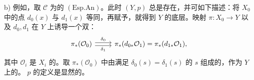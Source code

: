 b) 例如，取 $\mathcal C$ 为的 $(\mathrm{Esp.An})$。此时 $(Y,p)$ 总是存在，并可如下描述：将 $X_0$ 中的点 $d_0(x)$ 与 $d_1(x)$ 等同，再赋予，就得到 $Y$ 的底层。映射 $\pi:X_0\to Y$ 以及 $d_0,d_1$ 在 $Y$ 上诱导一个双：
\[
\begin{tikzcd}
\pi_*(\mathcal O_0)\arrow[r,shift left=.5ex,"\delta_0"]\arrow[r,shift right=.5ex,"\delta_1"']&\pi_*(d_{0*}\mathcal O_1)=\pi_*(d_{1*}\mathcal O_1),
\end{tikzcd}
\]
其中 $\mathcal O_i$ 是 $X_i$ 的。取 $\pi_*(\mathcal O_0)$ 中由满足 $\delta_0(s)=\delta_1(s)$ 的 $s$ 组成的，作为 $Y$ 上的。 $p$ 的定义是显然的。

